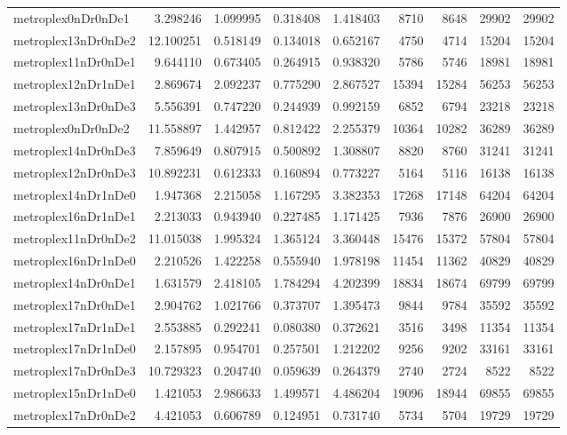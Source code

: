 \begin{longtable}{|l|r|r|r|r|r|r|r|r|}
metroplex0nDr0nDe1 & 3.298246 & 1.099995 & 0.318408 & 1.418403 & 8710 & 8648 & 29902 & 29902 \\
metroplex13nDr0nDe2 & 12.100251 & 0.518149 & 0.134018 & 0.652167 & 4750 & 4714 & 15204 & 15204 \\
metroplex11nDr0nDe1 & 9.644110 & 0.673405 & 0.264915 & 0.938320 & 5786 & 5746 & 18981 & 18981 \\
metroplex12nDr1nDe1 & 2.869674 & 2.092237 & 0.775290 & 2.867527 & 15394 & 15284 & 56253 & 56253 \\
metroplex13nDr0nDe3 & 5.556391 & 0.747220 & 0.244939 & 0.992159 & 6852 & 6794 & 23218 & 23218 \\
metroplex0nDr0nDe2 & 11.558897 & 1.442957 & 0.812422 & 2.255379 & 10364 & 10282 & 36289 & 36289 \\
metroplex14nDr0nDe3 & 7.859649 & 0.807915 & 0.500892 & 1.308807 & 8820 & 8760 & 31241 & 31241 \\
metroplex12nDr0nDe3 & 10.892231 & 0.612333 & 0.160894 & 0.773227 & 5164 & 5116 & 16138 & 16138 \\
metroplex14nDr1nDe0 & 1.947368 & 2.215058 & 1.167295 & 3.382353 & 17268 & 17148 & 64204 & 64204 \\
metroplex16nDr1nDe1 & 2.213033 & 0.943940 & 0.227485 & 1.171425 & 7936 & 7876 & 26900 & 26900 \\
metroplex11nDr0nDe2 & 11.015038 & 1.995324 & 1.365124 & 3.360448 & 15476 & 15372 & 57804 & 57804 \\
metroplex16nDr1nDe0 & 2.210526 & 1.422258 & 0.555940 & 1.978198 & 11454 & 11362 & 40829 & 40829 \\
metroplex14nDr0nDe1 & 1.631579 & 2.418105 & 1.784294 & 4.202399 & 18834 & 18674 & 69799 & 69799 \\
metroplex17nDr0nDe1 & 2.904762 & 1.021766 & 0.373707 & 1.395473 & 9844 & 9784 & 35592 & 35592 \\
metroplex17nDr1nDe1 & 2.553885 & 0.292241 & 0.080380 & 0.372621 & 3516 & 3498 & 11354 & 11354 \\
metroplex17nDr1nDe0 & 2.157895 & 0.954701 & 0.257501 & 1.212202 & 9256 & 9202 & 33161 & 33161 \\
metroplex17nDr0nDe3 & 10.729323 & 0.204740 & 0.059639 & 0.264379 & 2740 & 2724 & 8522 & 8522 \\
metroplex15nDr1nDe0 & 1.421053 & 2.986633 & 1.499571 & 4.486204 & 19096 & 18944 & 69855 & 69855 \\
metroplex17nDr0nDe2 & 4.421053 & 0.606789 & 0.124951 & 0.731740 & 5734 & 5704 & 19729 & 19729 \\

\end{longtable}
